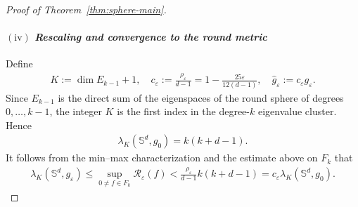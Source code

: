 \documentclass[11pt,reqno]{amsart}
\numberwithin{equation}{section}
\theoremstyle{definition}
\theoremstyle{remark}
\def\cR {\mathcal{R}}
\newcommand{\lam}{\lambda}
\newcommand{\0}{\emptyset}
\newcommand{\veps}{\varepsilon}
\newcommand{\bbS}{\mathbb S}
\begin{document}
\begin{proof}[Proof of Theorem~\ref{thm:sphere-main}]
\paragraph{$\mathrm{(iv)}$ \textit{Rescaling and convergence to the round metric}} Define
\begin{align}
        K
        :=
        \operatorname{dim}E_{k-1}+1,
        \quad
        c_\veps
        :=
        \frac{\rho_\veps}{d-1}
        =
        1-\frac{25\veps}{12(d-1)},\quad 
        \widehat g_\veps
        :=
        c_\veps g_\veps.
\end{align}
Since $E_{k-1}$ is the direct sum of the eigenspaces of the round sphere of degrees $0,\ldots,k-1$, the integer $K$ is the first index in the degree-$k$ eigenvalue cluster. Hence
\begin{align}\label{eqn:sphere-round-K}
        \lam_K(\bbS^d,g_0)
        =
        k(k+d-1).
\end{align}
It follows from the min--max characterization and the estimate above on
$F_k$ that
\begin{align}\label{eqn:sphere-unscaled-local-gap}
        \lam_K(\bbS^d,g_\veps)
        \leq
        \sup_{0\neq f\in F_k}\cR_\veps(f)
        <
        \frac{\rho_\veps}{d-1}k(k+d-1)
        =
        c_\veps\lam_K(\bbS^d,g_0).
\end{align}


\end{proof}
\end{document}
